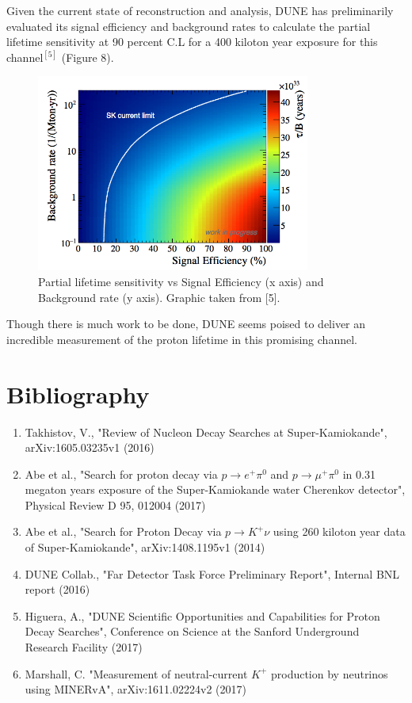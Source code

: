 \documentclass[aps,onecolumn,twoside,secnumarabic,balancelastpage,amsmath,amssymb,nofootinbib,hyperref=pdftex]{revtex4}
\begin{document}
Given the current state of reconstruction and analysis, DUNE has preliminarily evaluated its signal efficiency and background rates to calculate the partial lifetime sensitivity at 90 percent C.L for a 400 kiloton year exposure for this channel$^{[5]}$ (Figure 8).

\begin{figure}[htbp]
\begin{center}
\includegraphics[width=9cm]{sensitivity.png}
\caption{Partial lifetime sensitivity vs Signal Efficiency (x axis) and Background rate (y axis). Graphic taken from [5].}
\label{default}
\end{center}
\end{figure}

Though there is much work to be done, DUNE seems poised to deliver an incredible measurement of the proton lifetime in this promising channel. 

\section{Bibliography}
\begin{enumerate}
\item Takhistov, V.,  "Review of Nucleon Decay Searches at Super-Kamiokande", arXiv:1605.03235v1 (2016)
\item Abe et al., "Search for proton decay via $p \rightarrow e^{+}\pi^{0}$ and $p \rightarrow \mu^{+}\pi^{0}$ in 0.31 megaton years exposure of the Super-Kamiokande water Cherenkov detector",  Physical Review D 95, 012004 (2017)
\item Abe et al., "Search for Proton Decay via $p \rightarrow K^{+}\nu$ using 260 kiloton year data of Super-Kamiokande",  arXiv:1408.1195v1 (2014)
\item DUNE Collab., "Far Detector Task Force Preliminary Report", Internal BNL report (2016)
\item Higuera, A., "DUNE Scientific Opportunities and Capabilities for Proton Decay Searches", Conference on Science at the Sanford Underground Research Facility (2017)
\item Marshall, C. "Measurement of neutral-current $K^{+}$ production by neutrinos using MINERvA",  arXiv:1611.02224v2 (2017)
\end{enumerate}
\end{document}

